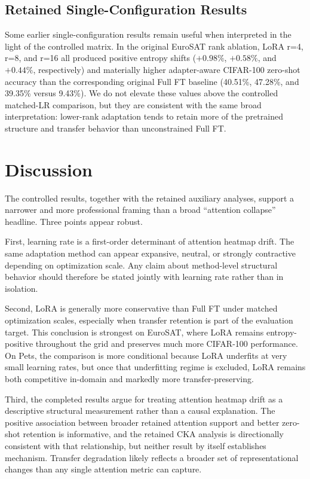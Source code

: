 \documentclass[10pt]{article}
\begin{document}
\subsection{Retained Single-Configuration Results}
Some earlier single-configuration results remain useful when interpreted in the light of the controlled matrix. In the original EuroSAT rank ablation, LoRA r=4, r=8, and r=16 all produced positive entropy shifts ($+0.98\%$, $+0.58\%$, and $+0.44\%$, respectively) and materially higher adapter-aware CIFAR-100 zero-shot accuracy than the corresponding original Full FT baseline (40.51\%, 47.28\%, and 39.35\% versus 9.43\%). We do not elevate these values above the controlled matched-LR comparison, but they are consistent with the same broad interpretation: lower-rank adaptation tends to retain more of the pretrained structure and transfer behavior than unconstrained Full FT.

\section{Discussion}
The controlled results, together with the retained auxiliary analyses, support a narrower and more professional framing than a broad ``attention collapse'' headline. Three points appear robust.

First, learning rate is a first-order determinant of attention heatmap drift. The same adaptation method can appear expansive, neutral, or strongly contractive depending on optimization scale. Any claim about method-level structural behavior should therefore be stated jointly with learning rate rather than in isolation.

Second, LoRA is generally more conservative than Full FT under matched optimization scales, especially when transfer retention is part of the evaluation target. This conclusion is strongest on EuroSAT, where LoRA remains entropy-positive throughout the grid and preserves much more CIFAR-100 performance. On Pets, the comparison is more conditional because LoRA underfits at very small learning rates, but once that underfitting regime is excluded, LoRA remains both competitive in-domain and markedly more transfer-preserving.

Third, the completed results argue for treating attention heatmap drift as a descriptive structural measurement rather than a causal explanation. The positive association between broader retained attention support and better zero-shot retention is informative, and the retained CKA analysis is directionally consistent with that relationship, but neither result by itself establishes mechanism. Transfer degradation likely reflects a broader set of representational changes than any single attention metric can capture.
\end{document}
